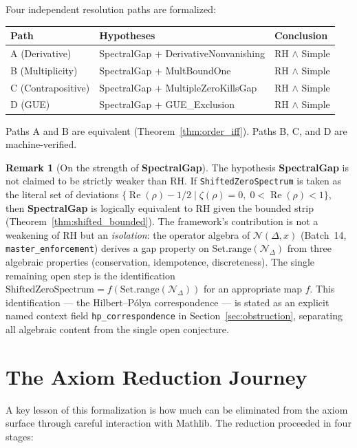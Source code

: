 \documentclass[12pt, a4paper]{article}
\theoremstyle{plain}
\theoremstyle{definition}
\newtheorem{remark}[theorem]{Remark}
\newcommand{\N}{\mathcal{N}}
\newcommand{\re}{\operatorname{Re}}
\newcommand{\lean}[1]{\texttt{#1}}
\newcommand{\Mathlib}{\textsf{Mathlib}}
\begin{document}
Four independent resolution paths are formalized:
\begin{center}
\begin{tabular}{lll}
  \toprule
  Path & Hypotheses & Conclusion \\
  \midrule
  A (Derivative) & SpectralGap + DerivativeNonvanishing & RH $\wedge$ Simple \\
  B (Multiplicity) & SpectralGap + MultBoundOne & RH $\wedge$ Simple \\
  C (Contrapositive) & SpectralGap + MultipleZeroKillsGap & RH $\wedge$ Simple \\
  D (GUE) & SpectralGap + GUE\_Exclusion & RH $\wedge$ Simple \\
  \bottomrule
\end{tabular}
\end{center}
Paths A and B are equivalent (Theorem~\ref{thm:order_iff}).
Paths B, C, and D are machine-verified.

\begin{remark}[On the strength of \textbf{SpectralGap}]
\label{rem:sg_strength}
The hypothesis \textbf{SpectralGap} is not claimed to be strictly weaker
than RH.
If \lean{ShiftedZeroSpectrum} is taken as the literal set of deviations
$\{\re(\rho) - 1/2 \mid \zeta(\rho) = 0,\; 0 < \re(\rho) < 1\}$,
then \textbf{SpectralGap} is logically equivalent to RH given the
bounded strip (Theorem~\ref{thm:shifted_bounded}).
The framework's contribution is not a weakening of RH but an
\emph{isolation}: the operator algebra of $\N(\Delta, x)$ (Batch~14,
\lean{master\_enforcement}) derives a gap property on
$\mathrm{Set.range}(\N_\Delta)$ from three algebraic properties
(conservation, idempotence, discreteness).
The single remaining open step is the identification
$\mathrm{ShiftedZeroSpectrum} = f(\mathrm{Set.range}(\N_\Delta))$
for an appropriate map $f$.
This identification --- the Hilbert--P\'{o}lya correspondence --- is
stated as an explicit named context field \lean{hp\_correspondence} in
Section~\ref{sec:obstruction}, separating all algebraic content from the
single open conjecture.
\end{remark}

\section{The Axiom Reduction Journey}
\label{sec:reduction}

A key lesson of this formalization is how much can be eliminated from the
axiom surface through careful interaction with \Mathlib{}.
The reduction proceeded in four stages:
\end{document}
